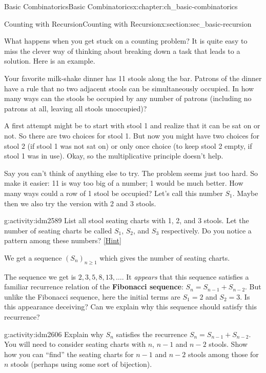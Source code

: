 \documentclass[oneside,10pt,]{book}
\newcommand{\terminology}[1]{\textbf{#1}}
\numberwithin{equation}{chapter}
\begin{document}
\begin{chapterptx}{Basic Combinatorics}{}{Basic Combinatorics}{}{}{x:chapter:ch_basic-combinatorics}
\begin{sectionptx}{Counting with Recursion}{}{Counting with Recursion}{}{}{x:section:sec_basic-recursion}
\begin{introduction}{}%
What happens when you get stuck on a counting problem?  It is quite easy to miss the clever way of thinking about breaking down a task that leads to a solution.  Here is an example.%
\par
Your favorite milk-shake dinner has 11 stools along the bar.  Patrons of the dinner have a rule that no two adjacent stools can be simultaneously occupied.  In how many ways can the stools be occupied by any number of patrons (including no patrons at all, leaving all stools unoccupied)?%
\par
A first attempt might be to start with stool 1 and realize that it can be sat on or not.  So there are two choices for stool 1.  But now you might have two choices for stool 2 (if stool 1 was not sat on) or only once choice (to keep stool 2 empty, if stool 1 was in use).  Okay, so the multiplicative principle doesn't help.%
\par
Say you can't think of anything else to try.  The problem seems just too hard.  So make it easier:  11 is way too big of a number; 1 would be much better.  How many ways could a row of 1 stool be occupied?  Let's call this number \(S_1\).  Maybe then we also try the version with 2 and 3 stools.%
\begin{activity}{}{g:activity:idm2589}%
List all stool seating charts with 1, 2, and 3 stools.  Let the number of seating charts be called \(S_1\), \(S_2\), and \(S_3\) respectively.  Do you notice a pattern among these numbers?%
\space\hspace*{0pt}\hfill{\tiny\hyperlink{g:hint:idm2595-back}{[Hint]}}\end{activity}
We get a sequence \((S_n)_{n \ge 1}\) which gives the number of seating charts.%
\par
The sequence we get is \(2, 3, 5, 8, 13, \ldots\).  It \emph{appears} that this sequence satisfies a familiar recurrence relation of the \terminology{Fibonacci sequence}: \(S_n = S_{n-1} + S_{n-2}\).  But unlike the Fibonacci sequence, here the initial terms are \(S_1 = 2\) and \(S_2 = 3\).  Is this appearance deceiving?  Can we explain why this sequence should satisfy this recurrence?%
\begin{activity}{}{g:activity:idm2606}%
Explain why \(S_n\) satisfies the recurrence \(S_n = S_{n-1} + S_{n-2}\).  You will need to consider seating charts with \(n\), \(n-1\) and \(n-2\) stools.  Show how you can ``find'' the seating charts for \(n-1\) and \(n-2\) stools among those for \(n\) stools (perhaps using some sort of bijection).%

\end{activity}
\end{introduction}
\end{sectionptx}
\end{chapterptx}
\end{document}
